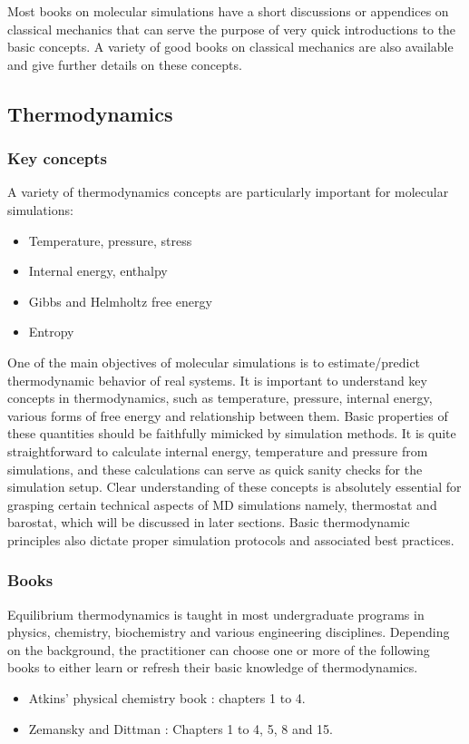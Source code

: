 \documentclass[9pt,bestpractices]{livecoms}
\begin{document}
Most books on molecular simulations have a short discussions or appendices on classical mechanics that can serve the purpose of very quick introductions to the basic concepts.
A variety of good books on classical mechanics are also available and give further details on these concepts.

\subsection{Thermodynamics}
\label{sec:thermodynamics}

\subsubsection{Key concepts}
A variety of thermodynamics concepts are particularly important for molecular simulations:
\begin{itemize}
\item Temperature, pressure, stress
\item Internal energy, enthalpy
\item Gibbs and Helmholtz free energy
\item Entropy
\end{itemize}

One of the main objectives of molecular simulations is to estimate/predict thermodynamic behavior of real systems. 
It is important to understand key concepts in thermodynamics, such as temperature, pressure, internal energy, various forms of free energy and relationship between them. 
Basic properties of these quantities should be faithfully mimicked by simulation methods. 
It is quite straightforward to calculate internal energy, temperature and pressure from simulations, and these calculations can serve as quick sanity checks for the simulation setup. 
Clear understanding of these concepts is absolutely essential for grasping certain technical aspects of MD simulations namely, thermostat and barostat, which will be discussed in later sections. 
Basic thermodynamic principles also dictate proper simulation protocols and associated best practices.



\subsubsection{Books}
Equilibrium thermodynamics is taught in most undergraduate programs in physics, chemistry, biochemistry and various engineering disciplines.
Depending on the background, the practitioner can choose one or more of the following books to either learn or refresh their basic knowledge of thermodynamics. 
\begin{itemize}
\item Atkins' physical chemistry book \cite{AtkinsBook} : chapters 1 to 4.
\item Zemansky and Dittman \cite{ZemanskyBook}: Chapters 1 to 4, 5, 8 and 15.
\end{itemize}
\end{document}
